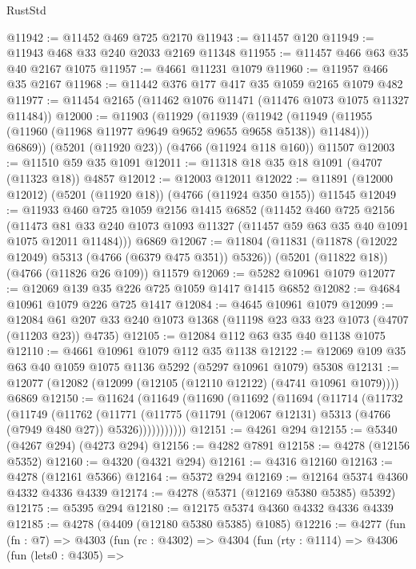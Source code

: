 \begin{lexlean}{RustStd}
\begin{coremodule}
{\begin{coremodule}
{{{{{{{{{{{{{{{{{{{{{{{{{{{{{{{{{{{@11942 := @11452 @469 @725 @2170
@11943 := @11457 @120
@11949 := @11943 @468 @33 @240 @2033 @2169 @11348
@11955 := @11457 @466 @63 @35 @40 @2167 @1075
@11957 := @4661 @11231 @1079
@11960 := @11957 @466 @35 @2167
@11968 := @11442 @376 @177 @417 @35 @1059 @2165 @1079 @482
@11977 := @11454 @2165 (@11462 @1076 @11471 (@11476 @1073 @1075 @11327 @11484))
@12000 := @11903
    (@11929
      (@11939
        (@11942 (@11949 (@11955 (@11960 (@11968 @11977 @9649 @9652 @9655 @9658 @5138)) @11484)))
        @6869))
    (@5201 (@11920 @23))
    (@4766 (@11924 @118 @160))
    @11507
@12003 := @11510 @59 @35 @1091
@12011 := @11318 @18 @35 @18 @1091 (@4707 (@11323 @18)) @4857
@12012 := @12003 @12011
@12022 := @11891 (@12000 @12012) (@5201 (@11920 @18)) (@4766 (@11924 @350 @155)) @11545
@12049 := @11933
    @460
    @725
    @1059
    @2156
    @1415
    @6852
    (@11452
      @460
      @725
      @2156
      (@11473 @81 @33 @240 @1073 @1093 @11327 (@11457 @59 @63 @35 @40 @1091 @1075 @12011 @11484)))
    @6869
@12067 := @11804
    (@11831 (@11878 (@12022 @12049) @5313 (@4766 (@6379 @475 @351)) @5326))
    (@5201 (@11822 @18))
    (@4766 (@11826 @26 @109))
    @11579
@12069 := @5282 @10961 @1079
@12077 := @12069 @139 @35 @226 @725 @1059 @1417 @1415 @6852
@12082 := @4684 @10961 @1079 @226 @725 @1417
@12084 := @4645 @10961 @1079
@12099 := @12084 @61 @207 @33 @240 @1073 @1368 (@11198 @23 @33 @23 @1073 (@4707 (@11203 @23)) @4735)
@12105 := @12084 @112 @63 @35 @40 @1138 @1075
@12110 := @4661 @10961 @1079 @112 @35 @1138
@12122 := @12069 @109 @35 @63 @40 @1059 @1075 @1136 @5292 (@5297 @10961 @1079) @5308
@12131 := @12077 (@12082 (@12099 (@12105 (@12110 @12122) (@4741 @10961 @1079)))) @6869
@12150 := @11624
    (@11649
      (@11690
        (@11692
          (@11694
            (@11714
              (@11732
                (@11749
                  (@11762
                    (@11771
                      (@11775
                        (@11791 (@12067 @12131) @5313 (@4766 (@7949 @480 @27)) @5326)))))))))))
@12151 := @4261 @294
@12155 := @5340 (@4267 @294) (@4273 @294)
@12156 := @4282 @7891
@12158 := @4278 (@12156 @5352)
@12160 := @4320 (@4321 @294)
@12161 := @4316 @12160
@12163 := @4278 (@12161 @5366)
@12164 := @5372 @294
@12169 := @12164 @5374 @4360 @4332 @4336 @4339
@12174 := @4278 (@5371 (@12169 @5380 @5385) @5392)
@12175 := @5395 @294
@12180 := @12175 @5374 @4360 @4332 @4336 @4339
@12185 := @4278 (@4409 (@12180 @5380 @5385) @1085)
@12216 := @4277
    (fun (fn : @7) =>
    @4303
      (fun (rc : @4302) =>
      @4304
        (fun (rty : @1114) =>
        @4306
          (fun (lets0 : @4305) =>
}}}}}}}}}}}}}}}}}}}}}}}}}}}}}}}}}}}
\end{coremodule}}
\end{coremodule}
\end{lexlean}
